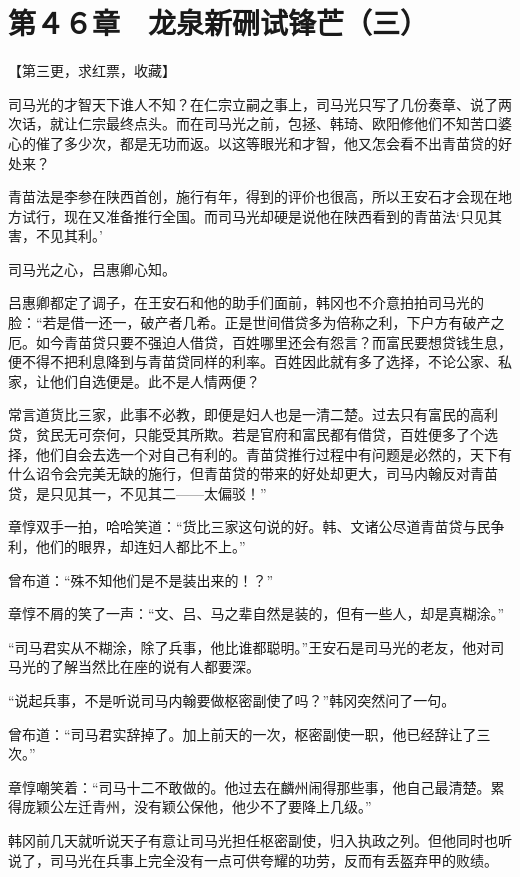 \section{第４６章　龙泉新硎试锋芒（三）}

【第三更，求红票，收藏】

司马光的才智天下谁人不知？在仁宗立嗣之事上，司马光只写了几份奏章、说了两次话，就让仁宗最终点头。而在司马光之前，包拯、韩琦、欧阳修他们不知苦口婆心的催了多少次，都是无功而返。以这等眼光和才智，他又怎会看不出青苗贷的好处来？

青苗法是李参在陕西首创，施行有年，得到的评价也很高，所以王安石才会现在地方试行，现在又准备推行全国。而司马光却硬是说他在陕西看到的青苗法‘只见其害，不见其利。’

司马光之心，吕惠卿心知。

吕惠卿都定了调子，在王安石和他的助手们面前，韩冈也不介意拍拍司马光的脸：“若是借一还一，破产者几希。正是世间借贷多为倍称之利，下户方有破产之厄。如今青苗贷只要不强迫人借贷，百姓哪里还会有怨言？而富民要想贷钱生息，便不得不把利息降到与青苗贷同样的利率。百姓因此就有多了选择，不论公家、私家，让他们自选便是。此不是人情两便？

常言道货比三家，此事不必教，即便是妇人也是一清二楚。过去只有富民的高利贷，贫民无可奈何，只能受其所欺。若是官府和富民都有借贷，百姓便多了个选择，他们自会去选一个对自己有利的。青苗贷推行过程中有问题是必然的，天下有什么诏令会完美无缺的施行，但青苗贷的带来的好处却更大，司马内翰反对青苗贷，是只见其一，不见其二——太偏驳！”

章惇双手一拍，哈哈笑道：“货比三家这句说的好。韩、文诸公尽道青苗贷与民争利，他们的眼界，却连妇人都比不上。”

曾布道：“殊不知他们是不是装出来的！？”

章惇不屑的笑了一声：“文、吕、马之辈自然是装的，但有一些人，却是真糊涂。”

“司马君实从不糊涂，除了兵事，他比谁都聪明。”王安石是司马光的老友，他对司马光的了解当然比在座的说有人都要深。

“说起兵事，不是听说司马内翰要做枢密副使了吗？”韩冈突然问了一句。

曾布道：“司马君实辞掉了。加上前天的一次，枢密副使一职，他已经辞让了三次。”

章惇嘲笑着：“司马十二不敢做的。他过去在麟州闹得那些事，他自己最清楚。累得庞颖公左迁青州，没有颖公保他，他少不了要降上几级。”

韩冈前几天就听说天子有意让司马光担任枢密副使，归入执政之列。但他同时也听说了，司马光在兵事上完全没有一点可供夸耀的功劳，反而有丢盔弃甲的败绩。

